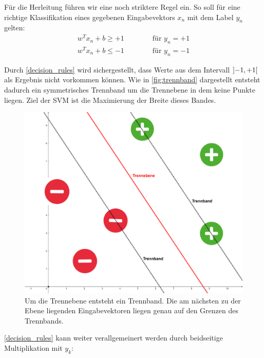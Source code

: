 \documentclass[a4paper,11pt,twoside]{scrreprt}
\begin{document}
Für die Herleitung führen wir eine noch striktere Regel ein. So soll für eine richtige Klassifikation eines gegebenen Eingabevektors $x_{n}$ mit dem Label $y_{n}$ gelten:
\begin{subequations} \label{decision_rules}
	\begin{alignat}{2}
		w^{T} x_{n} + b \geq +1 & \qquad & \text{ für } y_{n} = +1\\
		w^{T} x_{n} + b \leq -1 & & \text{ für } y_{n} = -1
	\end{alignat}
\end{subequations}


Durch \autoref{decision_rules} wird sichergestellt, dass Werte aus dem Intervall $\interval[open]{-1}{+1}$ als Ergebnis nicht vorkommen können. Wie in \autoref{fig:trennband} dargestellt entsteht dadurch ein symmetrisches Trennband um die Trennebene in dem keine Punkte liegen. Ziel der \ac{SVM} ist die Maximierung der Breite dieses Bandes.\\

\begin{figure}[H]
	\centering
	\includegraphics[width = 13cm]{assets/trennband.png}
	\caption{Um die Trennebene entsteht ein Trennband. Die am nächsten zu der Ebene liegenden Eingabevektoren liegen genau auf den Grenzen des Trennbands.}
	\label{fig:trennband}
\end{figure}



 \autoref{decision_rules} kann weiter verallgemeinert werden durch beidseitige Multiplikation mit $y_{k}$:
\end{document}
